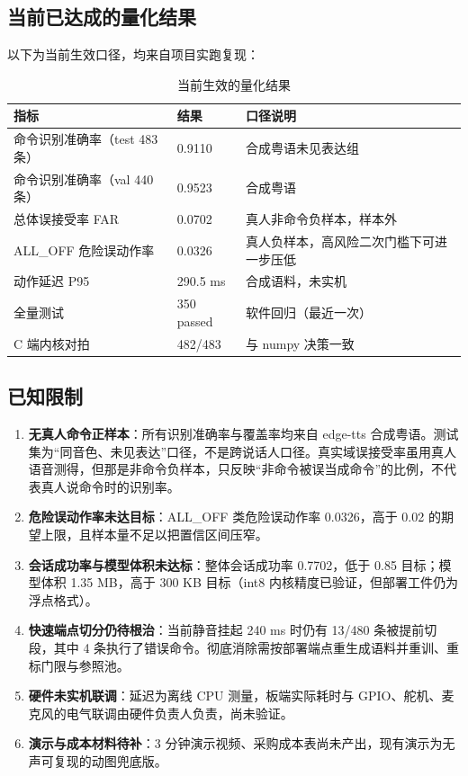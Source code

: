 \documentclass[UTF8,a4paper,12pt,fontset=fandol]{ctexart}
\begin{document}
\subsection{当前已达成的量化结果}

以下为当前生效口径，均来自项目实跑复现：

\begin{table}[H]
  \centering
  \small
  \caption{当前生效的量化结果}
  \begin{tabularx}{\textwidth}{@{}lXX@{}}
    \toprule
    指标 & 结果 & 口径说明 \\
    \midrule
    命令识别准确率（test 483 条） & 0.9110 & 合成粤语未见表达组 \\
    命令识别准确率（val 440 条） & 0.9523 & 合成粤语 \\
    总体误接受率 FAR & 0.0702 & 真人非命令负样本，样本外 \\
    ALL\_OFF 危险误动作率 & 0.0326 & 真人负样本，高风险二次门槛下可进一步压低 \\
    动作延迟 P95 & 290.5 ms & 合成语料，未实机 \\
    全量测试 & 350 passed & 软件回归（最近一次） \\
    C 端内核对拍 & 482/483 & 与 numpy 决策一致 \\
    \bottomrule
  \end{tabularx}
\end{table}

\subsection{已知限制}

\begin{enumerate}[leftmargin=2em]
  \item \textbf{无真人命令正样本}：所有识别准确率与覆盖率均来自 edge-tts 合成粤语。测试集为“同音色、未见表达”口径，不是跨说话人口径。真实域误接受率虽用真人语音测得，但那是非命令负样本，只反映“非命令被误当成命令”的比例，不代表真人说命令时的识别率。
  \item \textbf{危险误动作率未达目标}：ALL\_OFF 类危险误动作率 0.0326，高于 0.02 的期望上限，且样本量不足以把置信区间压窄。
  \item \textbf{会话成功率与模型体积未达标}：整体会话成功率 0.7702，低于 0.85 目标；模型体积 1.35 MB，高于 300 KB 目标（int8 内核精度已验证，但部署工件仍为浮点格式）。
  \item \textbf{快速端点切分仍待根治}：当前静音挂起 240 ms 时仍有 13/480 条被提前切段，其中 4 条执行了错误命令。彻底消除需按部署端点重生成语料并重训、重标门限与参照池。
  \item \textbf{硬件未实机联调}：延迟为离线 CPU 测量，板端实际耗时与 GPIO、舵机、麦克风的电气联调由硬件负责人负责，尚未验证。
  \item \textbf{演示与成本材料待补}：3 分钟演示视频、采购成本表尚未产出，现有演示为无声可复现的动图兜底版。
\end{enumerate}
\end{document}
